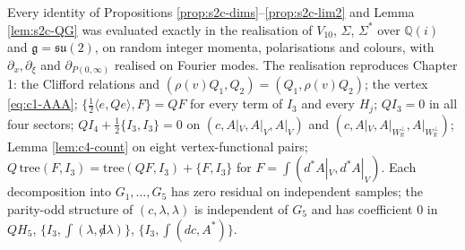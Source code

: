 \begin{remark}
\label{rem:s2c-method}
Every identity of Propositions \ref{prop:s2c-dims}--\ref{prop:s2c-lim2} and Lemma \ref{lem:s2c-QG} was evaluated exactly in the realisation of $V_{10}$, $\Sigma$, $\Sigma^*$ over $\mathbb Q(i)$ and $\mathfrak g=\mathfrak{su}(2)$, on random integer momenta, polarisations and colours, with $\partial_x,\partial_\xi$ and $\partial_{P(0,\infty)}$ realised on Fourier modes. The realisation reproduces Chapter 1: the Clifford relations and $(\rho(v)Q_1,Q_2)=(Q_1,\rho(v)Q_2)$; the vertex \eqref{eq:c1-AAA}; $\{\tfrac12\langle e,Qe\rangle,F\}=QF$ for every term of $I_3$ and every $H_j$; $QI_3=0$ in all four sectors; $QI_4+\tfrac12\{I_3,I_3\}=0$ on $(c,A|_V,A|_V,A|_V)$ and $(c,A|_V,A|_{W_{\mathbb R}^\perp},A|_{W_{\mathbb R}^\perp})$; Lemma \ref{lem:c4-count} on eight vertex-functional pairs; $Q\,\mathrm{tree}(F,I_3)=\mathrm{tree}(QF,I_3)+\{F,I_3\}$ for $F=\int(d^*A|_V,d^*A|_V)$. Each decomposition into $G_1,\dots,G_5$ has zero residual on independent samples; the parity-odd structure of $(c,\lambda,\lambda)$ is independent of $G_5$ and has coefficient $0$ in $QH_5$, $\{I_3,\int(\lambda,{\not d}\lambda)\}$, $\{I_3,\int(dc,A^*)\}$.
\end{remark}
